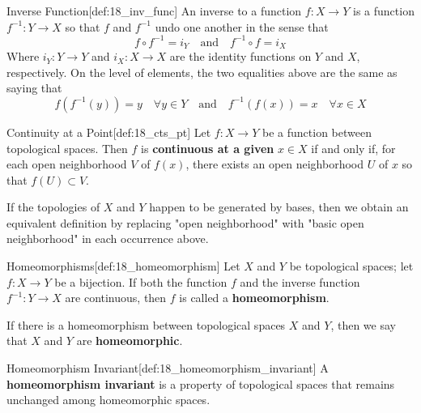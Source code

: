 \begin{defBox}{Inverse Function}[def:18_inv_func]
    An inverse to a function \( f: X \rightarrow Y \) is a function
    \( f^{ -1 }: Y \rightarrow X \) so that \( f \) and \( f^{ -1 } \) undo
    one another in the sense that 
    \begin{equation*}
        f \circ f^{ -1 } = i_{ Y } 
        \quad \mathrm{and} \quad 
        f^{ -1 } \circ f = i_{ X }
    \end{equation*}
    Where \( i_{ Y }: Y \rightarrow Y \) and \( i_{ X }: X \rightarrow X \) are the identity functions on \( Y \) and \( X \), respectively.
    On the level of elements, the two equalities above are the same as saying 
    that
    \begin{equation*}
        f ( f^{ -1 } ( y ) ) = y
        \quad \forall y \in Y
        \quad \mathrm{and} \quad 
        f^{ -1 } ( f ( x ) ) = x   
        \quad \forall x \in X   
    \end{equation*}
\end{defBox}

\begin{defBox}{Continuity at a Point}[def:18_cts_pt]
    Let \( f: X \rightarrow Y \) be a function between topological spaces.
    Then \( f \) is \textbf{continuous at a given} \( x \in X \) if and only if,
    for each open neighborhood \( V \) of \( f ( x ) \), there exists an open neighborhood \( U \) of \( x \) so that \( f ( U ) \subset V \).

    \baseSkip

    If the topologies of \( X \) and \( Y \) happen to be generated by bases, then we obtain an equivalent definition by replacing "open neighborhood" 
    with "basic open neighborhood" in each occurrence above.
\end{defBox}

\begin{defBox}{Homeomorphisms}[def:18_homeomorphism]
    Let \( X \) and \( Y \) be topological spaces; let \( f: X \rightarrow Y \)
    be a bijection.
    If both the function \( f \) and the inverse function \( f^{ -1 }: Y 
    \rightarrow X \) are continuous, then \( f \) is called a 
    \textbf{homeomorphism}.

    \baseSkip

    If there is a homeomorphism between topological spaces \( X \) and \( Y \),
    then we say that \( X \) and \( Y \) are \textbf{homeomorphic}.
\end{defBox}

\begin{defBox}{Homeomorphism Invariant}[def:18_homeomorphism_invariant]
    A \textbf{homeomorphism invariant} is a property of topological spaces that 
    remains unchanged among homeomorphic spaces.
\end{defBox}

